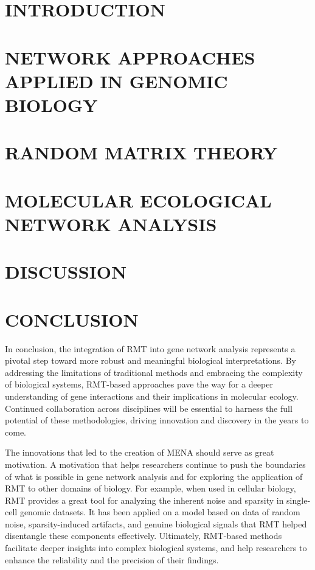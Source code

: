 \documentclass[leqno]{article}[12pt]
\begin{document}
\section{INTRODUCTION}\label{sec:introduction}


\section{NETWORK APPROACHES APPLIED IN GENOMIC BIOLOGY}\label{sec:network-approaches-applied-in-genomic-biology}


\section{RANDOM MATRIX THEORY}\label{sec:random-matrix-theory}


\section{MOLECULAR ECOLOGICAL NETWORK ANALYSIS}\label{sec:molecular-ecological-network-analysis}


\section{DISCUSSION}\label{sec:discussion}


\section{CONCLUSION}\label{sec:conclusion}
In conclusion, the integration of RMT into gene network analysis represents a pivotal step toward more robust and meaningful biological interpretations.
By addressing the limitations of traditional methods and embracing the complexity of biological systems, RMT-based approaches pave the way for a deeper understanding of gene interactions and their implications in molecular ecology.
Continued collaboration across disciplines will be essential to harness the full potential of these methodologies, driving innovation and discovery in the years to come.

\noindent The innovations that led to the creation of MENA should serve as great motivation.
A motivation that helps researchers continue to push the boundaries of what is possible in gene network analysis and for exploring the application of RMT to other domains of biology.
For example, when used in cellular biology\cite{aparicio_random_2020}, RMT provides a great tool for analyzing the inherent noise and sparsity in single-cell genomic datasets.
It has been applied on a model based on data of random noise, sparsity-induced artifacts, and genuine biological signals that RMT helped disentangle these components effectively.
Ultimately, RMT-based methods facilitate deeper insights into complex biological systems, and help researchers to enhance the reliability and the precision of their findings.
\end{document}
